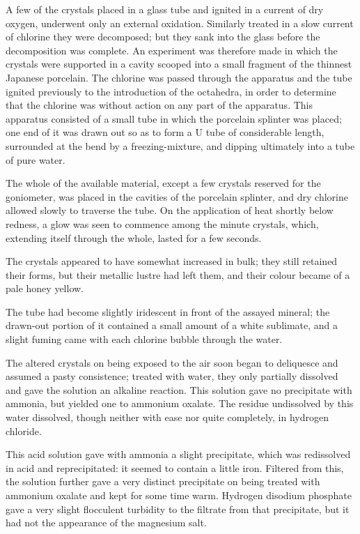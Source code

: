 \documentclass[a4paper, 12pt, oneside]{article}
\begin{document}
A few of the crystals placed in a glass tube and ignited in a current of dry oxygen, underwent only an external oxidation. Similarly treated in a slow current of chlorine they were decomposed; but they sank into the glass before the decomposition was complete. An experiment was therefore made in which the crystals were supported in a cavity scooped into a small fragment of the thinnest Japanese porcelain. The chlorine was passed through the apparatus and the tube ignited previously to the introduction of the octahedra, in order to determine that the chlorine was without action on any part of the apparatus. This apparatus consisted of a small tube in which the porcelain splinter was placed; one end of it was drawn out so as to form a U tube of considerable length, surrounded at the bend by a freezing-mixture, and dipping ultimately into a tube of pure water.

The whole of the available material, except a few crystals reserved for the goniometer, was placed in the cavities of the porcelain splinter, and dry chlorine allowed slowly to traverse the tube. On the application of heat shortly below redness, a glow was seen to commence among the minute crystals, which, extending itself through the whole, lasted for a few seconds.

The crystals appeared to have somewhat increased in bulk; they still retained their forms, but their metallic lustre had left them, and their colour became of a pale honey yellow.

The tube had become slightly iridescent in front of the assayed mineral; the drawn-out portion of it contained a small amount of a white sublimate, and a slight fuming came with each chlorine bubble through the water.

The altered crystals on being exposed to the air soon began to deliquesce and assumed a pasty consistence; treated with water, they only partially dissolved and gave the solution an alkaline reaction. This solution gave no precipitate with ammonia, but yielded one to ammonium oxalate. The residue undissolved by this water dissolved, though neither with ease nor quite completely, in hydrogen chloride.

This acid solution gave with ammonia a slight precipitate, which was redissolved in acid and reprecipitated: it seemed to contain a little iron. Filtered from this, the solution further gave a very distinct precipitate on being treated with ammonium oxalate and kept for some time warm. Hydrogen disodium phosphate gave a very slight flocculent turbidity to the filtrate from that precipitate, but it had not the appearance of the magnesium salt.
\end{document}

